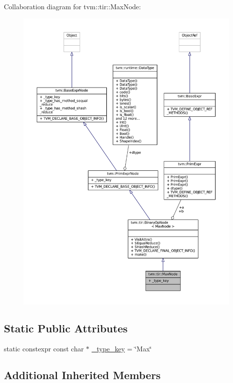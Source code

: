 Collaboration diagram for tvm\+:\+:tir\+:\+:Max\+Node\+:
\nopagebreak
\begin{figure}[H]
\begin{center}
\leavevmode
\includegraphics[width=350pt]{classtvm_1_1tir_1_1MaxNode__coll__graph}
\end{center}
\end{figure}
\subsection*{Static Public Attributes}
\begin{DoxyCompactItemize}
\item 
static constexpr const char $\ast$ \hyperlink{classtvm_1_1tir_1_1MaxNode_a9fff9d6e0159415bf773cc619754d6ec}{\+\_\+type\+\_\+key} = \char`\"{}Max\char`\"{}
\end{DoxyCompactItemize}
\subsection*{Additional Inherited Members}


